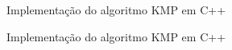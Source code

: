 \begin{frame}[fragile]{Implementação do algoritmo KMP em C++}
\end{frame}

\begin{frame}[fragile]{Implementação do algoritmo KMP em C++}
\end{frame}
